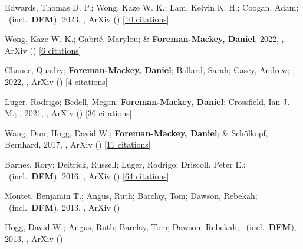 \item[{\color{numcolor}\scriptsize8}] Edwards, Thomas D. P.; Wong, Kaze W. K.; Lam, Kelvin K. H.; Coogan, Adam; \etal\ (incl.\ \textbf{DFM}), 2023, , ArXiv () [\href{https://ui.adsabs.harvard.edu/abs/2023arXiv230205329E}{10 citations}]

\item[{\color{numcolor}\scriptsize7}] Wong, Kaze W. K.; Gabri{\'e}, Marylou; \& \textbf{Foreman-Mackey, Daniel}, 2022, , ArXiv () [\href{https://ui.adsabs.harvard.edu/abs/2022arXiv221106397W}{6 citations}]

\item[{\color{numcolor}\scriptsize6}] Chance, Quadry; \textbf{Foreman-Mackey, Daniel}; Ballard, Sarah; Casey, Andrew; \etal, 2022, , ArXiv () [\href{https://ui.adsabs.harvard.edu/abs/2022arXiv220611275C}{4 citations}]

\item[{\color{numcolor}\scriptsize5}] Luger, Rodrigo; Bedell, Megan; \textbf{Foreman-Mackey, Daniel}; Crossfield, Ian J. M.; \etal, 2021, , ArXiv () [\href{https://ui.adsabs.harvard.edu/abs/2021arXiv211006271L}{36 citations}]

\item[{\color{numcolor}\scriptsize4}] Wang, Dun; Hogg, David W.; \textbf{Foreman-Mackey, Daniel}; \& Sch{\"o}lkopf, Bernhard, 2017, , ArXiv () [\href{https://ui.adsabs.harvard.edu/abs/2017arXiv171002428W}{11 citations}]

\item[{\color{numcolor}\scriptsize3}] Barnes, Rory; Deitrick, Russell; Luger, Rodrigo; Driscoll, Peter E.; \etal\ (incl.\ \textbf{DFM}), 2016, , ArXiv () [\href{https://ui.adsabs.harvard.edu/abs/2016arXiv160806919B}{64 citations}]

\item[{\color{numcolor}\scriptsize2}] Montet, Benjamin T.; Angus, Ruth; Barclay, Tom; Dawson, Rebekah; \etal\ (incl.\ \textbf{DFM}), 2013, , ArXiv ()

\item[{\color{numcolor}\scriptsize1}] Hogg, David W.; Angus, Ruth; Barclay, Tom; Dawson, Rebekah; \etal\ (incl.\ \textbf{DFM}), 2013, , ArXiv ()